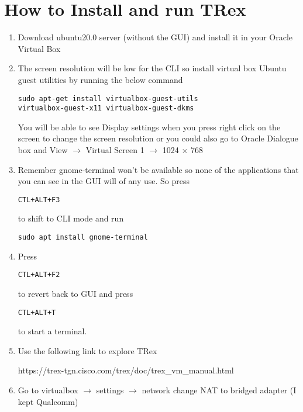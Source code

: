 \documentclass[conference, english, letterpaper, onecolumn, draft]{IEEEtran}
\begin{document}
\section{How to Install and run TRex}
\begin{enumerate}
\item Download ubuntu20.0 server (without the GUI) and install it in your Oracle Virtual Box
\item The screen resolution will be low for the CLI so install virtual box Ubuntu guest utilities by running the below command

\begin{verbatim}
sudo apt-get install virtualbox-guest-utils 
virtualbox-guest-x11 virtualbox-guest-dkms
\end{verbatim}

You will be able to see Display settings when you press right click on the screen to change the screen resolution or you could also go to Oracle Dialogue box and View $\rightarrow$ Virtual Screen 1 $\rightarrow$ 1024 $\times$ 768

\item Remember gnome-terminal won't be available so none of the applications that you can see in the GUI will of any use. So press 

\begin{verbatim}
CTL+ALT+F3 
\end{verbatim}

to shift to CLI mode and run

\begin{verbatim}
sudo apt install gnome-terminal
\end{verbatim}

\item Press 

\begin{verbatim}
CTL+ALT+F2 
\end{verbatim}

to revert back to GUI and press 

\begin{verbatim}
CTL+ALT+T 
\end{verbatim}

to start a terminal. 

\item Use the following link to explore TRex

https://trex-tgn.cisco.com/trex/doc/trex_vm_manual.html

\item Go to virtualbox $\rightarrow$ settings $\rightarrow$ network
change NAT to bridged adapter (I kept Qualcomm)


\end{enumerate}
\end{document}

